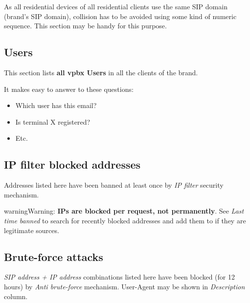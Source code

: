 \documentclass[letterpaper,10pt,english]{sphinxmanual}
\begin{document}
As all residential devices of all residential clients use the same SIP domain (brand's SIP domain), collision has to be
avoided using some kind of numeric sequence. This section may be handy for this purpose.


\subsection{Users}
\label{administration_portal/brand/views/users::doc}\label{administration_portal/brand/views/users:users}
This section lists \textbf{all vpbx Users} in all the clients of the brand.

It makes easy to answer to these questions:
\begin{itemize}
\item {} 
Which user has this email?

\item {} 
Is terminal X registered?

\item {} 
Etc.

\end{itemize}


\subsection{IP filter blocked addresses}
\label{administration_portal/brand/views/ipfilter_blocked_addresses:ip-filter-blocked-addresses}\label{administration_portal/brand/views/ipfilter_blocked_addresses::doc}\label{administration_portal/brand/views/ipfilter_blocked_addresses:id1}
Addresses listed here have been banned at least once by \emph{IP filter} security mechanism.

\begin{notice}{warning}{Warning:}
\textbf{IPs are blocked per request, not permanently}. See \emph{Last time banned} to search for recently blocked
addresses and add them to {\hyperref[security_and_maintenance/security/authorized_ip_ranges:authorized\string-ip\string-ranges]{}} if they are legitimate sources.
\end{notice}


\subsection{Brute-force attacks}
\label{administration_portal/brand/views/bruteforce_attacks::doc}\label{administration_portal/brand/views/bruteforce_attacks:brute-force-attacks}\label{administration_portal/brand/views/bruteforce_attacks:id1}
\emph{SIP address + IP address} combinations listed here have been blocked (for 12 hours) by \emph{Anti brute-force} mechanism.
User-Agent may be shown in \emph{Description} column.
\end{document}
